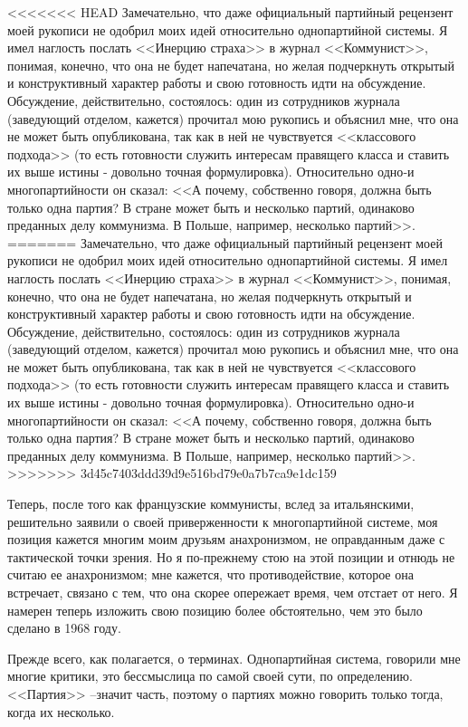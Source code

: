 \documentclass{book}
\begin{document}
<<<<<<< HEAD
Замечательно, что даже официальный партийный рецензент моей рукописи не одобрил моих идей относительно однопар­тийной системы. Я имел наглость послать <<Инерцию страха>> в журнал <<Коммунист>>, понимая, конечно, что она не будет напечатана, но желая подчеркнуть открытый и конструктив­ный характер работы и свою готовность идти на обсуждение. Обсуждение, действительно, состоялось: один из сотрудников журнала (заведующий отделом, кажется) прочитал мою ру­копись и объяснил мне, что она не может быть опубликована, так как в ней не чувствуется <<классового подхода>> (то есть готовности служить интересам правящего класса и ставить их выше истины ‑ довольно точная формулировка). Относитель­но одно‑и многопартийности он сказал: <<А почему, собствен­но говоря, должна быть только одна партия? В стране может быть и несколько партий, одинаково преданных делу комму­низма. В Польше, например, несколько партий>>.
=======
Замечательно, что даже официальный партийный рецензент моей рукописи не одобрил моих идей относительно однопар­тийной системы. Я имел наглость послать <<Инерцию страха>> в журнал <<Коммунист>>, понимая, конечно, что она не будет напечатана, но желая подчеркнуть открытый и конструктив­ный характер работы и свою готовность идти на обсуждение. Обсуждение, действительно, состоялось: один из сотрудников журнала (заведующий отделом, кажется) прочитал мою ру­копись и объяснил мне, что она не может быть опубликована, так как в ней не чувствуется <<классового подхода>> (то есть готовности служить интересам правящего класса и ставить их выше истины - довольно точная формулировка). Относитель­но одно-и многопартийности он сказал: <<А почему, собствен­но говоря, должна быть только одна партия? В стране может быть и несколько партий, одинаково преданных делу комму­низма. В Польше, например, несколько партий>>.
>>>>>>> 3d45c7403ddd39d9e516bd79e0a7b7ca9e1dc159

Теперь, после того как французские коммунисты, вслед за итальянскими, решительно заявили о своей приверженности к многопартийной системе, моя позиция кажется многим моим друзьям анахронизмом, не оправданным даже с тактической точки зрения. Но я по-прежнему стою на этой позиции и отнюдь не считаю ее анахронизмом; мне кажется, что противодействие, которое она встречает, связано с тем, что она скорее опережает время, чем отстает от него. Я намерен теперь изложить свою позицию более обстоятельно, чем это было сделано в 1968 году.

Прежде всего, как полагается, о терминах. Однопартийная система, говорили мне многие критики, это бессмыслица по са­мой своей сути, по определению. <<Партия>> --значит часть,  по­этому о партиях можно говорить только тогда, когда их не­сколько.
\end{document}
